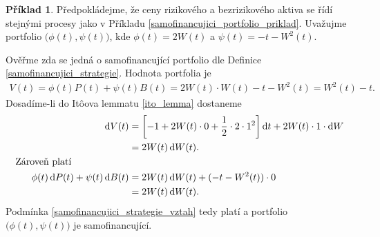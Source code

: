 \documentclass[a4paper,12pt]{report}
\theoremstyle{definition} \newtheorem{definice}[veta]{Definice}
\newtheorem{priklad}{Příklad}
\theoremstyle{remark}
\begin{document}
\begin{priklad}
Předpokládejme, že ceny rizikového a bezrizikového aktiva se řídí stejnými procesy jako v Příkladu \ref{samofinancujici_portfolio_priklad}.
Uvažujme portfolio $\big(\phi(t),\psi(t)\big)$, kde $\phi(t)=2W(t)$ a $\psi(t)=-t-W^2(t)$. 

Ověřme zda se jedná o samofinancující portfolio dle Definice \ref{samofinancujici_strategie}.
Hodnota portfolia je 
\begin{align*}
V(t)=\phi(t)P(t)+\psi(t)B(t)=2W(t)\cdot W(t)-t-W^2(t)=W^2(t)-t. 
\end{align*}
Dosadíme-li do It\^oova lemmatu \ref{ito_lemma} dostaneme
\begin{alignat*}{2}
\mathrm{d}V(t)&=\left[-1+2W(t)\cdot0+\frac12\cdot2\cdot1^2\right]\mathrm{d}t+2W(t)\cdot1\cdot\mathrm{d}W\\
&=2W(t)\,\mathrm{d}W(t).\\
\text{Zároveň platí}\hspace{2.1cm}\\
\phi(t)\,\mathrm{d}P(t)+\psi(t)\,\mathrm{d}B(t)&=2W(t)\,\mathrm{d}W(t)+(-t-W^2(t))\cdot0\\
&=2W(t)\,\mathrm{d}W(t).
\end{alignat*}
Podmínka \eqref{samofinancujici_strategie_vztah} tedy platí a portfolio $\big(\phi(t),\psi(t)\big)$ je samofinancující.
\end{priklad}
\end{document}
